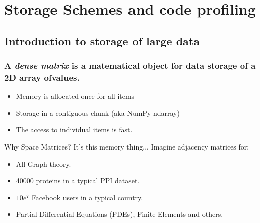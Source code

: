 \documentclass[10pt,colorlinks]{beamer}
\begin{document}
\section{Storage Schemes and code profiling}
\subsection{Introduction to storage of large data}
\begin{frame}[fragile]\frametitle{A \emph{dense matrix} is a matematical object for data storage of a 2D array ofvalues. }
\begin{itemize}
    \item Memory is allocated once for all items
    \item Storage in a contiguous chunk (aka NumPy ndarray)
    \item The access to individual items is fast.
\end{itemize}
\begin{block}{Why Space Matrices?}
It's this memory thing...  Imagine adjacency matrices for:
    \begin{itemize}
        \item All Graph theory.
        \item 40000 proteins in a typical PPI dataset.
        \item $10e^7$ Facebook users in a typical country.
        \item Partial Differential Equations (PDEs), Finite Elements and others. 
    \end{itemize}
\end{block}

\end{frame}
\end{document}
